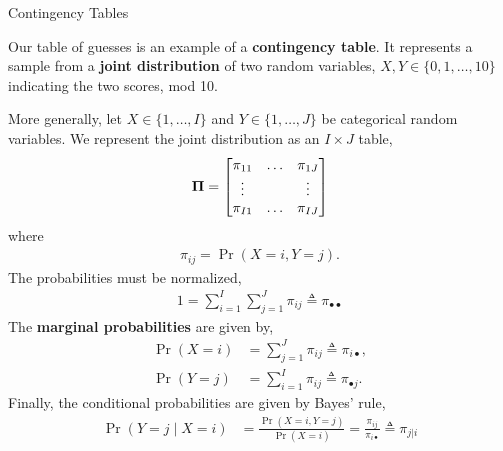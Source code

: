 \documentclass[aspectratio=169]{beamer}
\begin{document}
      
\begin{frame}[t,allowframebreaks]{Contingency Tables}\label{contingency-tables}
  
  Our table of guesses is an example of a \textbf{contingency table}. It
  represents a sample from a \textbf{joint distribution} of two random
  variables, \(X, Y \in \{0,1,\ldots, 10\}\) indicating the two scores,
  mod 10.
  
  More generally, let \(X \in \{1,\ldots, I\}\) and
  \(Y \in \{1,\ldots, J\}\) be categorical random variables. We represent
  the joint distribution as an \(I \times J\) table, \begin{align*}
  \boldsymbol{\Pi} = \begin{bmatrix}
  \pi_{11} & \ldots & \pi_{1J} \\
  \vdots & & \vdots \\
  \pi_{I1} & \ldots & \pi_{IJ}
  \end{bmatrix}
  \end{align*} where \begin{align*}
  \pi_{ij} = \Pr(X = i, Y = j).
  \end{align*} The probabilities must be normalized, \begin{align*}
  1 = \sum_{i=1}^I \sum_{j=1}^J \pi_{ij} \triangleq \pi_{\bullet \bullet}
  \end{align*} The \textbf{marginal probabilities} are given by,
  \begin{align*}
  \Pr(X = i) &= \sum_{j=1}^J \pi_{ij} \triangleq \pi_{i \bullet}, \\
  \Pr(Y = j) &= \sum_{i=1}^I \pi_{ij} \triangleq \pi_{\bullet j}.
  \end{align*} Finally, the conditional probabilities are given by Bayes'
  rule, \begin{align*}
  \Pr(Y =j \mid X=i) &= \frac{\Pr(X=i, Y=j)}{\Pr(X=i)} = \frac{\pi_{ij}}{\pi_{i \bullet}} \triangleq \pi_{j | i}
  \end{align*}
  
  \end{frame}
  
  
  
\end{document}
